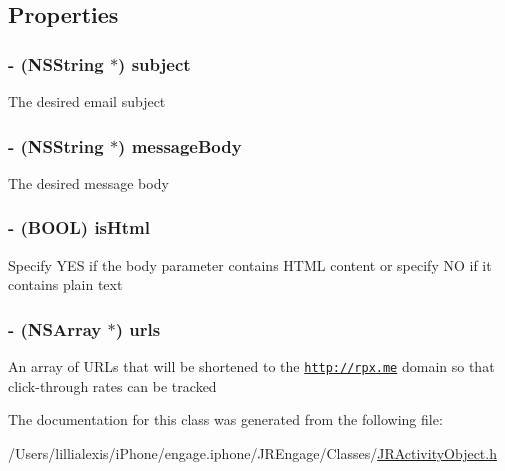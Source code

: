 \subsection{Properties}
\hypertarget{interface_j_r_email_object_a618a23c34ede4a4eb56ed6cf05d91b64}{
\subsubsection[{subject}]{\setlength{\rightskip}{0pt plus 5cm}-\/ (NSString $\ast$) subject}}
\label{interface_j_r_email_object_a618a23c34ede4a4eb56ed6cf05d91b64}
The desired email subject \hypertarget{interface_j_r_email_object_ad0e6a07cb2aec3cf6eee75d2ace32e7d}{
\subsubsection[{messageBody}]{\setlength{\rightskip}{0pt plus 5cm}-\/ (NSString $\ast$) messageBody}}
\label{interface_j_r_email_object_ad0e6a07cb2aec3cf6eee75d2ace32e7d}
The desired message body \hypertarget{interface_j_r_email_object_af372942f67fba5e93fb2b53f4ee8a3c5}{
\subsubsection[{isHtml}]{\setlength{\rightskip}{0pt plus 5cm}-\/ (BOOL) isHtml}}
\label{interface_j_r_email_object_af372942f67fba5e93fb2b53f4ee8a3c5}
Specify YES if the body parameter contains HTML content or specify NO if it contains plain text \hypertarget{interface_j_r_email_object_a3f274a24ce4145b46cb5f0cda50378ce}{
\subsubsection[{urls}]{\setlength{\rightskip}{0pt plus 5cm}-\/ (NSArray $\ast$) urls}}
\label{interface_j_r_email_object_a3f274a24ce4145b46cb5f0cda50378ce}
An array of URLs that will be shortened to the \href{http://rpx.me}{\tt http://rpx.me} domain so that click-\/through rates can be tracked 

The documentation for this class was generated from the following file:\begin{DoxyCompactItemize}
\item 
/Users/lillialexis/iPhone/engage.iphone/JREngage/Classes/\hyperlink{_j_r_activity_object_8h}{JRActivityObject.h}\end{DoxyCompactItemize}
